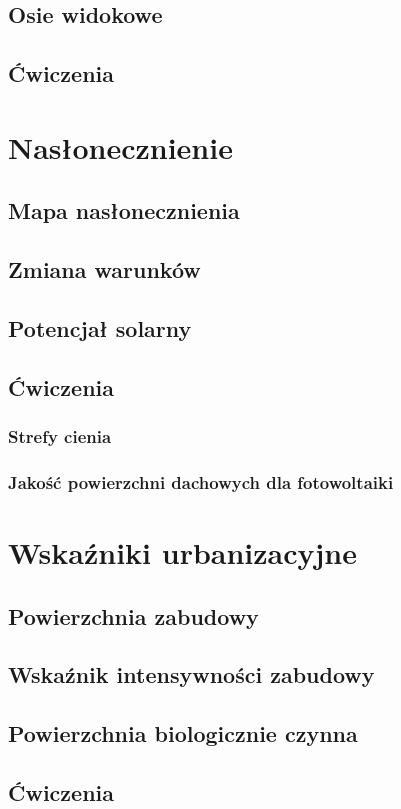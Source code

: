 \documentclass[a4paper,11pt, onecolumn, openany]{memoir}
\begin{document}
\section{Osie widokowe}
\section{Ćwiczenia}

\chapter{Nasłonecznienie}
\section{Mapa nasłonecznienia}
\section{Zmiana warunków}
\section{Potencjał solarny}
\section{Ćwiczenia}
\subsection{Strefy cienia}
\subsection{Jakość powierzchni dachowych dla fotowoltaiki}

\chapter{Wskaźniki urbanizacyjne}
\section{Powierzchnia zabudowy}
\section{Wskaźnik intensywności zabudowy}
\section{Powierzchnia biologicznie czynna}
\section{Ćwiczenia}
\end{document}
